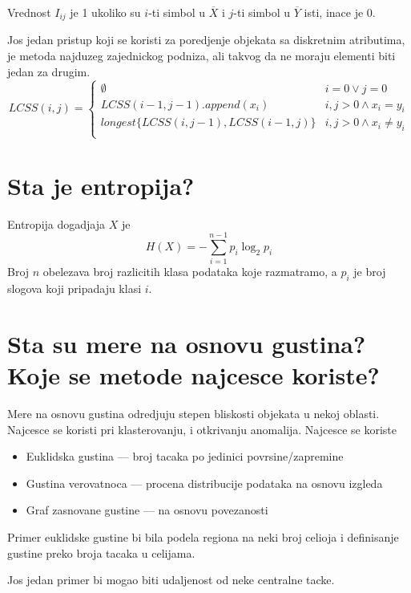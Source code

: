 \documentclass[a4paper]{article}
\begin{document}
Vrednost \(I_{ij}\) je 1 ukoliko su \(i\)-ti simbol u \(\overline{X}\) i \(j\)-ti simbol u
\(\overline{Y}\) isti, inace je 0.

Jos jedan pristup koji se koristi za poredjenje objekata sa diskretnim atributima, je metoda
najduzeg zajednickog podniza, ali takvog da ne moraju elementi biti jedan za drugim.
\begin{equation}\label{eq:lcss}
    LCSS(i, j) =
    \begin{cases}
        \emptyset & i = 0 \lor j = 0 \\
        LCSS(i-1, j-1).append(x_i) & i,j > 0 \land x_i = y_i \\
        longest\{LCSS(i, j-1), LCSS(i-1, j)\} & i,j > 0 \land x_i \neq y_i \\
    \end{cases}
\end{equation}

\section{Sta je entropija?}
Entropija dogadjaja \(X\) je
\[
    H(X) = - \sum_{i=1}^{n-1}p_i\log_{2}p_i
\]
Broj \(n\) obelezava broj razlicitih klasa podataka koje razmatramo, a \(p_i\) je broj slogova
koji pripadaju klasi \(i\).

\section{Sta su mere na osnovu gustina? Koje se metode najcesce koriste?}
Mere na osnovu gustina odredjuju stepen bliskosti objekata u nekoj oblasti. Najcesce se koristi pri
klasterovanju, i otkrivanju anomalija. Najcesce se koriste
\begin{itemize}
        \item Euklidska gustina --- broj tacaka po jedinici povrsine/zapremine
        \item Gustina verovatnoca --- procena distribucije podataka na osnovu izgleda
        \item Graf zasnovane gustine --- na osnovu povezanosti
\end{itemize}
Primer euklidske gustine bi bila podela regiona na neki broj celioja i definisanje gustine preko
broja tacaka u celijama.

Jos jedan primer bi mogao biti udaljenost od neke centralne tacke.
\end{document}

